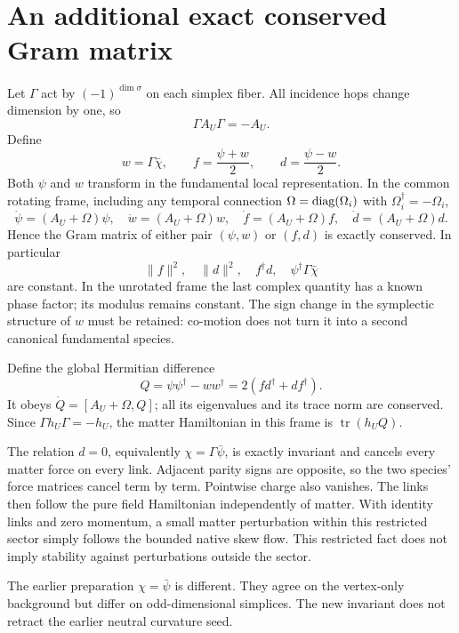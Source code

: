 \documentclass[11pt,a4paper]{article}
\newcommand{\tr}{\operatorname{tr}}\newcommand{\Rea}{\operatorname{Re}}\newcommand{\U}{\mathrm U}
\begin{document}
\newpage
\section{An additional exact conserved Gram matrix}
Let $\Gamma$ act by $(-1)^{\dim\sigma}$ on each simplex fiber. All incidence hops change dimension by one, so
\[
\Gamma A_U\Gamma=-A_U.
\]
Define
\begin{equation}
w=\Gamma\bar\chi,\qquad f=\frac{\psi+w}{2},\qquad d=\frac{\psi-w}{2}.
\end{equation}
Both $\psi$ and $w$ transform in the fundamental local representation. In the common rotating frame, including any temporal connection $\Omega=\operatorname{diag}(\Omega_i)$ with $\Omega_i^\dagger=-\Omega_i$,
\begin{equation}
\dot\psi=(A_U+\Omega)\psi,\quad
\dot w=(A_U+\Omega)w,\quad
\dot f=(A_U+\Omega)f,\quad\dot d=(A_U+\Omega)d.\label{eq:comove}
\end{equation}
Hence the Gram matrix of either pair $(\psi,w)$ or $(f,d)$ is exactly conserved. In particular
\[
\|f\|^2,\quad\|d\|^2,\quad f^\dagger d,\quad
\psi^\dagger\Gamma\bar\chi
\]
are constant. In the unrotated frame the last complex quantity has a known phase factor; its modulus remains constant. The sign change in the symplectic structure of $w$ must be retained: co-motion does not turn it into a second canonical fundamental species.

Define the global Hermitian difference
\[
Q=\psi\psi^\dagger-ww^\dagger=2(fd^\dagger+df^\dagger).
\]
It obeys $\dot Q=[A_U+\Omega,Q]$; all its eigenvalues and its trace norm are conserved. Since $\Gamma h_U\Gamma=-h_U$, the matter Hamiltonian in this frame is $\tr(h_UQ)$.

The relation $d=0$, equivalently $\chi=\Gamma\bar\psi$, is exactly invariant and cancels every matter force on every link. Adjacent parity signs are opposite, so the two species' force matrices cancel term by term. Pointwise charge also vanishes. The links then follow the pure field Hamiltonian independently of matter. With identity links and zero momentum, a small matter perturbation within this restricted sector simply follows the bounded native skew flow. This restricted fact does not imply stability against perturbations outside the sector.

The earlier preparation $\chi=\bar\psi$ is different. They agree on the vertex-only background but differ on odd-dimensional simplices. The new invariant does not retract the earlier neutral curvature seed.
\end{document}
